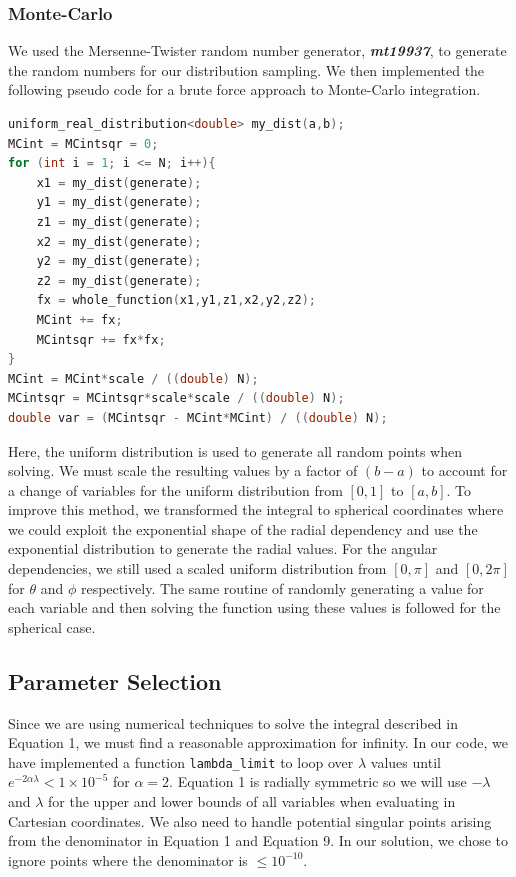 \documentclass{emulateapj}
\begin{document}
\subsubsection{Monte-Carlo}
We used the Mersenne-Twister random number generator, \textbf{\textit{mt19937}}, to generate the random numbers for our distribution sampling. We then implemented the following pseudo code for a brute force approach to Monte-Carlo integration.
\begin{lstlisting}[language=c++]
uniform_real_distribution<double> my_dist(a,b);
MCint = MCintsqr = 0;
for (int i = 1; i <= N; i++){
    x1 = my_dist(generate);
    y1 = my_dist(generate);
    z1 = my_dist(generate);
    x2 = my_dist(generate);
    y2 = my_dist(generate);
    z2 = my_dist(generate);
    fx = whole_function(x1,y1,z1,x2,y2,z2);
    MCint += fx;
    MCintsqr += fx*fx;
}
MCint = MCint*scale / ((double) N);
MCintsqr = MCintsqr*scale*scale / ((double) N);
double var = (MCintsqr - MCint*MCint) / ((double) N);
\end{lstlisting}
Here, the uniform distribution is used to generate all random points when solving. We must scale the resulting values by a factor of $(b-a)$ to account for a change of variables for the uniform distribution from $[0,1]$ to $[a,b]$. To improve this method, we transformed the integral to spherical coordinates where we could exploit the exponential shape of the radial dependency and use the exponential distribution to generate the radial values. For the angular dependencies, we still used a scaled uniform distribution from $[0,\pi]$ and $[0,2\pi]$ for $\theta$ and $\phi$ respectively. The same routine of randomly generating a value for each variable and then solving the function using these values is followed for the spherical case.
\subsection{Parameter Selection}
\label{subsec:parameters}
Since we are using numerical techniques to solve the integral described in Equation 1, we must find a reasonable approximation for infinity. In our code, we have implemented a function \texttt{lambda\_limit} to loop over $\lambda$ values until $e^{-2\alpha\lambda} < 1\times10^{-5}$ for $\alpha = 2$. Equation 1 is radially symmetric so we will use $-\lambda$ and $\lambda$ for the upper and lower bounds of all variables when evaluating in Cartesian coordinates. We also need to handle potential singular points arising from the denominator in Equation 1 and Equation 9. In our solution, we chose to ignore points where the denominator is $\leq 10^{-10}$.
\end{document}
